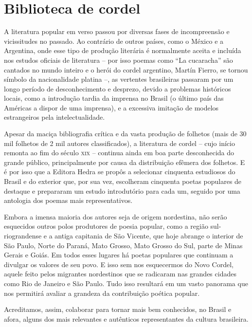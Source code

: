 \vspace*{.15\textheight}

\section{Biblioteca de cordel}


A literatura popular em verso passou por diversas fases de incompreensão e
vicissitudes no passado. Ao contrário de outros países, como o México e a
Argentina, onde esse tipo de produção literária é normalmente aceita e incluída
nos estudos oficiais de literatura -- por isso poemas como ``La cucaracha'' são
cantados no mundo inteiro e o herói do cordel argentino, Martín Fierro, se
tornou símbolo da nacionalidade platina \mbox{--,} as vertentes brasileiras passaram por
um longo período de desconhecimento e desprezo, devido a problemas históricos
locais, como a introdução tardia da imprensa no Brasil (o último país das
Américas a dispor de uma imprensa), e a excessiva imitação de modelos
estrangeiros pela intelectualidade. 

Apesar da maciça bibliografia crítica e da vasta produção de folhetos (mais de
30 mil folhetos de 2 mil autores classificados), a literatura de cordel -- cujo
início remonta ao fim do século \textsc{xix} -- continua ainda em boa parte desconhecida
do grande público, principalmente por causa da distribuição efêmera dos
folhetos. E é por isso que a Editora Hedra se propôs a selecionar cinquenta
estudiosos do Brasil e do exterior que, por sua vez, escolheram cinquenta poetas
populares de destaque e prepararam um estudo introdutório para cada um, seguido
por uma antologia dos poemas mais representativos. 

Embora a imensa maioria dos autores seja de origem nordestina, não serão
esquecidos outros polos produtores de poesia popular, como a região
sul-riograndense e a antiga capitania de São Vicente, que hoje abrange o
interior de São Paulo, Norte do Paraná, Mato Grosso, Mato Grosso do Sul, parte
de Minas Gerais e Goiás. Em todos esses lugares há poetas populares que
continuam a divulgar os valores de seu povo. E isso sem nos esquecermos do Novo
Cordel, aquele feito pelos migrantes nordestinos que se radicaram nas grandes
cidades como Rio de Janeiro e São Paulo. Tudo isso resultará em um vasto
panorama que nos permitirá avaliar a grandeza da contribuição poética popular. 

Acreditamos, assim, colaborar para tornar mais bem conhecidos, no Brasil e afora,
alguns dos mais relevantes e autênticos representantes da cultura brasileira. 

